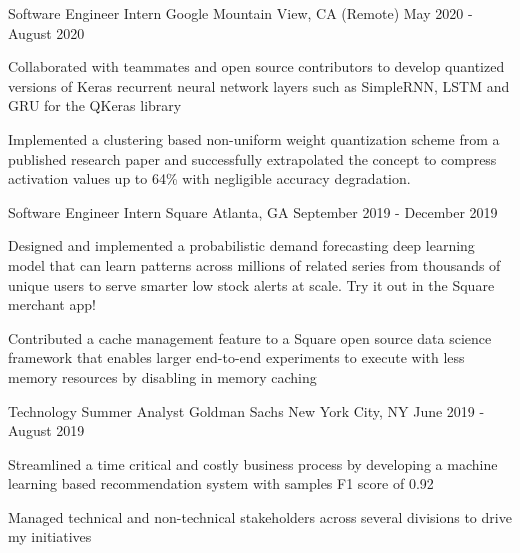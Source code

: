 \begin{cventries}
  \cventry
    {Software Engineer Intern} %
    {Google} %
    {Mountain View, CA (Remote)} %
    {May 2020 - August 2020} %
    {
      \begin{cvitems} %
        \item { Collaborated with teammates and open source contributors to develop quantized versions of Keras recurrent neural network layers such as SimpleRNN, LSTM and GRU for the QKeras library }
        \item { Implemented a clustering based non-uniform weight quantization scheme from a published research paper and successfully extrapolated the concept to compress activation values up to 64\% with negligible accuracy degradation. }
      \end{cvitems}
    }

  \cventry
    {Software Engineer Intern} %
    {Square} %
    {Atlanta, GA} %
    {September 2019 - December 2019} %
    {
      \begin{cvitems} %
        \item { Designed and implemented a probabilistic demand forecasting deep learning model that can learn patterns across millions of related series from thousands of unique users to serve smarter low stock alerts at scale. Try it out in the Square merchant app! }
        \item { Contributed a cache management feature to a Square open source data science framework that enables larger end-to-end experiments to execute with less memory resources by disabling in memory caching }
      \end{cvitems}
    }

  \cventry
    {Technology Summer Analyst} %
    {Goldman Sachs} %
    {New York City, NY} %
    {June 2019 - August 2019} %
    {
      \begin{cvitems} %
        \item {Streamlined a time critical and costly business process by developing a machine learning based recommendation system with samples F1 score of 0.92}
        \item {Managed technical and non-technical stakeholders across several divisions to drive my initiatives }
      \end{cvitems}
    }


\end{cventries}
